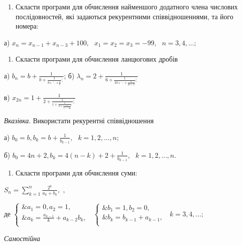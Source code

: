\documentclass[]{article}
\begin{document}
\begin{enumerate}
\def\labelenumi{\arabic{enumi})}
\item
  Скласти програми для обчислення найменшого додатного члена числових
  послідовностей, які задаються рекурентними співвідношеннями, та його
  номера:
\end{enumerate}

а)
\(x_{n} = x_{n - 1} + x_{n - 3} + 100,\mathrm{\text{\ \ \ \ \ }}x_{1} = x_{2} = x_{3} = - 99,\mathrm{\text{\ \ \ }}n = 3,4,\ldots;\)

\begin{enumerate}
\def\labelenumi{\arabic{enumi})}
\item
  Скласти програми для обчислення ланцюгових дробів
\end{enumerate}

а) \(b_{n} = b + \frac{1}{b + \frac{1}{b + \ddots + \frac{1}{b}};}\); б)
\(\lambda_{n} = 2 + \frac{1}{6 + \frac{1}{10 + \ddots + \frac{1}{4n + 2}};}\)

в)
\(x_{2n} = 1 + \frac{1}{2 + \frac{1}{1 + \frac{1}{2 + \frac{1}{1 + \ddots + \frac{1}{2}}}.};}\)

\emph{\emph{Вказівка}}. Використати рекурентні співвідношення

а)
\(b_{0} = b,b_{k} = b + \frac{1}{b_{k - 1}},\mathrm{\text{\ \ }}k = 1,2,\ldots,n;\)

б)
\(b_{0} = 4n + 2,b_{k} = 4(n - k) + 2 + \frac{1}{b_{k - 1}},\mathrm{\text{\ \ }}k = 1,2,\ldots,n.\)

\begin{enumerate}
\def\labelenumi{\arabic{enumi})}
\item
  Скласти програми для обчислення суми:
\end{enumerate}

\(S_{n} = \sum_{k = 1}^{n}\frac{2^{k}}{a_{k} + b_{k}},\) ,

де \(\left\{ \begin{matrix}
\& a_{1} = 0,a_{2} = 1, \\
\& a_{k} = \frac{a_{k - 1}}{k} + a_{k - 2}b_{k}, \\
\end{matrix} \right.\ \) \(\left\{ \begin{matrix}
\& b_{1} = 1,b_{2} = 0, \\
\& b_{k} = b_{k - 1} + a_{k - 1}, \\
\end{matrix} \right.\ \) \(k = 3,4,\ldots;\)

\emph{Самостійна}
\end{document}
